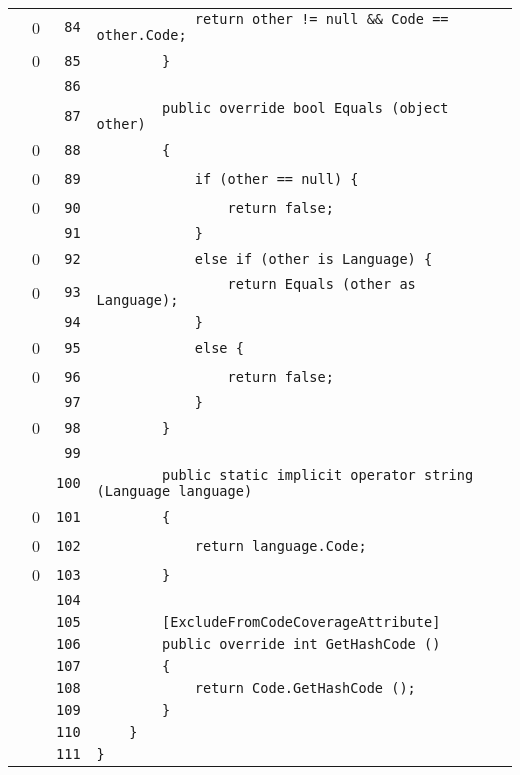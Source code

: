 \documentclass[a4paper,10pt]{article}
\begin{document}
\begin{longtable}[l]{lrrl}
\cellcolor{red} & 0 & \verb~84~ & \verb~            return other != null && Code == other.Code;~\\
\cellcolor{red} & 0 & \verb~85~ & \verb~        }~\\
\cellcolor{gray} &  & \verb~86~ & \verb~~\\
\cellcolor{gray} &  & \verb~87~ & \verb~        public override bool Equals (object other)~\\
\cellcolor{red} & 0 & \verb~88~ & \verb~        {~\\
\cellcolor{red} & 0 & \verb~89~ & \verb~            if (other == null) {~\\
\cellcolor{red} & 0 & \verb~90~ & \verb~                return false;~\\
\cellcolor{gray} &  & \verb~91~ & \verb~            }~\\
\cellcolor{red} & 0 & \verb~92~ & \verb~            else if (other is Language) {~\\
\cellcolor{red} & 0 & \verb~93~ & \verb~                return Equals (other as Language);~\\
\cellcolor{gray} &  & \verb~94~ & \verb~            }~\\
\cellcolor{red} & 0 & \verb~95~ & \verb~            else {~\\
\cellcolor{red} & 0 & \verb~96~ & \verb~                return false;~\\
\cellcolor{gray} &  & \verb~97~ & \verb~            }~\\
\cellcolor{red} & 0 & \verb~98~ & \verb~        }~\\
\cellcolor{gray} &  & \verb~99~ & \verb~~\\
\cellcolor{gray} &  & \verb~100~ & \verb~        public static implicit operator string (Language language)~\\
\cellcolor{red} & 0 & \verb~101~ & \verb~        {~\\
\cellcolor{red} & 0 & \verb~102~ & \verb~            return language.Code;~\\
\cellcolor{red} & 0 & \verb~103~ & \verb~        }~\\
\cellcolor{gray} &  & \verb~104~ & \verb~~\\
\cellcolor{gray} &  & \verb~105~ & \verb~        [ExcludeFromCodeCoverageAttribute]~\\
\cellcolor{gray} &  & \verb~106~ & \verb~        public override int GetHashCode ()~\\
\cellcolor{gray} &  & \verb~107~ & \verb~        {~\\
\cellcolor{gray} &  & \verb~108~ & \verb~            return Code.GetHashCode ();~\\
\cellcolor{gray} &  & \verb~109~ & \verb~        }~\\
\cellcolor{gray} &  & \verb~110~ & \verb~    }~\\
\cellcolor{gray} &  & \verb~111~ & \verb~}~\\
\end{longtable}
\newpage
\end{document}
